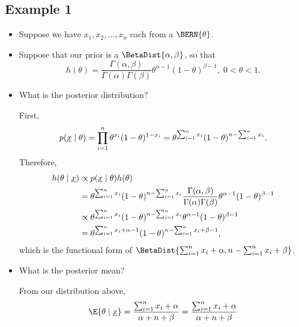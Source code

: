 \subsection*{Example 1}
\begin{itemize}
      \item Suppose we have $ x_1,x_2,\ldots,x_n $ each from a $ \BERN{\theta} $.
      \item Suppose that our prior is a $ \BetaDist{\alpha,\beta} $, so that
            \[ h(\theta)=\frac{\Gamma(\alpha,\beta)}{\Gamma(\alpha)\Gamma(\beta)}\theta^{\alpha-1}(1-\theta)^{\beta-1},\; 0<\theta<1. \]
      \item What is the posterior distribution?
            \begin{framed}
                  First,
                  \[ p(\underline{x}\mid \theta)=\prod_{i=1}^n \theta^{x_i}(1-\theta)^{1-x_i}=\theta^{\sum_{i=1}^{n}x_i}(1-\theta)^{n-\sum_{i=1}^{n}x_i}. \]
                  Therefore,
                  \begin{align*}
                        h(\theta\mid \underline{x})
                         & \propto p(\underline{x}\mid \theta)h(\theta)                                                                                                                \\
                         & =\theta^{\sum_{i=1}^{n}x_i}(1-\theta)^{n-\sum_{i=1}^{n}x_i}\frac{\Gamma(\alpha,\beta)}{\Gamma(\alpha)\Gamma(\beta)}\theta^{\alpha-1}(1-\theta)^{\beta-1} \\
                         & \propto \theta^{\sum_{i=1}^{n}x_i}(1-\theta)^{n-\sum_{i=1}^{n}x_i}\theta^{\alpha-1}(1-\theta)^{\beta-1}                                                  \\
                         & = \theta^{\sum_{i=1}^{n}x_i+\alpha-1}(1-\theta)^{n-\sum_{i=1}^{n}x_i+\beta-1},
                  \end{align*}
                  which is the functional form of $ \BetaDist{\sum_{i=1}^{n}x_i+\alpha,n-\sum_{i=1}^{n}x_i+\beta} $.
            \end{framed}
      \item What is the posterior mean?
            \begin{framed}
                  From our distribution above,
                  \begin{align*}
                        \E{\theta\mid \Vector{x}}=\frac{\sum_{i=1}^{n}x_i+\alpha}{\alpha+n+\beta}
                         & =\frac{\sum_{i=1}^{n}x_i+\alpha}{\alpha+n+\beta}                                                                                                              \\

\end{align*}
\end{framed}
\end{itemize}
